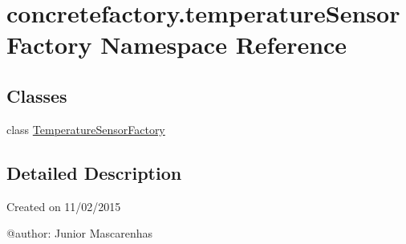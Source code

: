 \hypertarget{namespaceconcretefactory_1_1temperatureSensorFactory}{}\section{concretefactory.\+temperature\+Sensor\+Factory Namespace Reference}
\label{namespaceconcretefactory_1_1temperatureSensorFactory}
\subsection*{Classes}
\begin{DoxyCompactItemize}
\item 
class \hyperlink{classconcretefactory_1_1temperatureSensorFactory_1_1TemperatureSensorFactory}{Temperature\+Sensor\+Factory}
\end{DoxyCompactItemize}


\subsection{Detailed Description}
\begin{DoxyVerb}Created on 11/02/2015

@author: Junior Mascarenhas
\end{DoxyVerb}
 